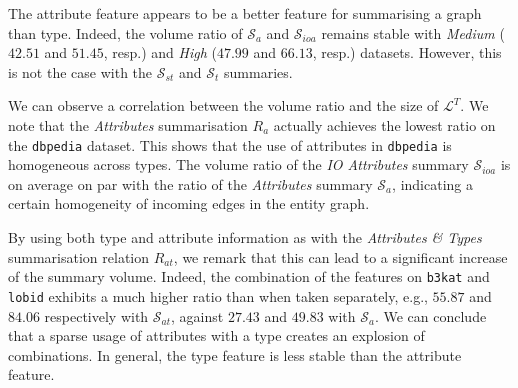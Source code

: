 The attribute feature appears to be a better feature for summarising a graph than type. Indeed, the volume ratio of $\mathcal{S}_a$ and $\mathcal{S}_{ioa}$ remains stable with \emph{Medium} ($42.51$ and $51.45$, resp.) and \emph{High} ($47.99$ and $66.13$, resp.) datasets. However, this is not the case with the $\mathcal{S}_{st}$ and $\mathcal{S}_t$ summaries.

We can observe a correlation between the volume ratio and the size of $\mathcal{L}^T$.
We note that the \emph{Attributes} summarisation $R_a$ actually achieves the lowest ratio on the \texttt{dbpedia} dataset. This shows that the use of attributes in \texttt{dbpedia} is homogeneous across types. The volume ratio of the \emph{IO Attributes} summary $\mathcal{S}_{ioa}$ is on average on par with the ratio of the \emph{Attributes} summary $\mathcal{S}_a$, indicating a certain homogeneity of incoming edges in the entity graph.

By using both type and attribute information as with the \emph{Attributes \& Types} summarisation relation $R_{at}$, we remark that this can lead to a significant increase of the summary volume. Indeed, the combination of the features on \texttt{b3kat} and \texttt{lobid} exhibits a much higher ratio than when taken separately, e.g., $55.87$ and $84.06$ respectively with $\mathcal{S}_{at}$, against $27.43$ and $49.83$ with $\mathcal{S}_a$. We can conclude that a sparse usage of attributes with a type creates an explosion of combinations. In general, the type feature is less stable than the attribute feature.

